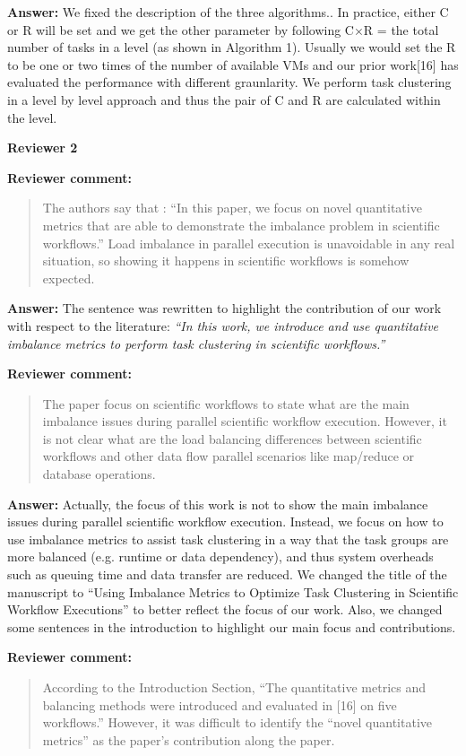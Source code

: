 \documentclass{letter}
\newenvironment{review}%
{\textbf{Reviewer comment:}\begin{quote}}%
{\end{quote}}%
\newcommand{\answer}[1]{%
      \textbf{Answer:} #1}
\newcommand{\revised}[1]{\emph{#1}\color{black}}
\begin{document}
\begin{letter}{}
\answer{We fixed the description of the three algorithms.. In practice, either C or R will be set and we get the other parameter by following C$\times$R = the total number of tasks in a level (as shown in Algorithm 1). Usually we would set the R to be one or two times of the number of available VMs and our prior work[16] has evaluated the performance with different graunlarity. We perform task clustering in a level by level approach and thus the pair of C and R are calculated within the level.}


\newpage

\textbf{Reviewer 2}


\begin{review}
The authors say that : ``In this paper, we focus on novel quantitative metrics that are able to demonstrate the imbalance problem in scientific workflows.'' Load imbalance in parallel execution is unavoidable in any real situation, so showing it happens in scientific workflows is somehow expected.
\end{review}

\answer{The sentence was rewritten to highlight the contribution of our work with respect to the literature:
\revised{``In this work, we introduce and use quantitative imbalance metrics to perform task clustering in scientific workflows.''}}


\begin{review}
The paper focus on scientific workflows to state what are the main imbalance issues during parallel scientific workflow execution. However, it is not clear what are the load balancing differences between scientific workflows and other data flow parallel scenarios like map/reduce or database operations.
\end{review}

\answer{Actually, the focus of this work is not to show the main imbalance issues during parallel scientific workflow execution. Instead, we focus on how to use imbalance metrics to assist task clustering in a way that the task groups are more balanced (e.g. runtime or data dependency), and thus system overheads such as queuing time and data transfer are reduced. We changed the title of the manuscript to ``Using Imbalance Metrics to Optimize Task Clustering in Scientific Workflow Executions'' to better reflect the focus of our work. Also, we changed some sentences in the introduction to highlight our main focus and contributions.}


\begin{review}
According to the Introduction Section, ``The quantitative metrics and balancing methods were introduced and evaluated in [16] on five workflows.'' However, it was difficult to identify the ``novel quantitative metrics'' as the paper's contribution along the paper. 
\end{review}


\end{letter}
\end{document}
